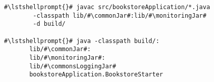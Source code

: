 \begin{lstlisting}[caption=Command to compile and run the instrumented Bookstore under Linux,label=lst:bookstoreStarterLinux]
#\lstshellprompt{}# javac src/bookstoreApplication/*.java
        -classpath lib/#\commonJar#:lib/#\monitoringJar#
        -d build/

#\lstshellprompt{}# java -classpath build/:
       lib/#\commonJar#:
       lib/#\monitoringJar#:
       lib/#\commonsLoggingJar#
       bookstoreApplication.BookstoreStarter 
\end{lstlisting}
